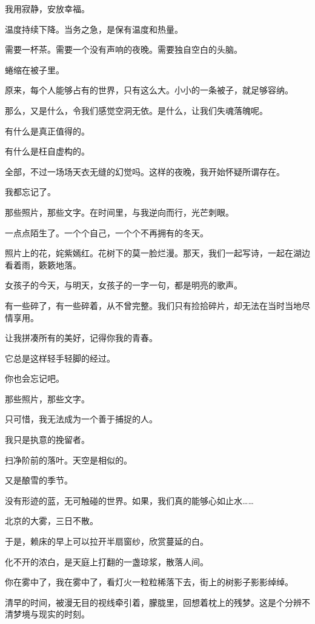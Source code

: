 \documentclass[12pt,a4paper]{article}
\begin{document}
		我用寂静，安放幸福。

		温度持续下降。当务之急，是保有温度和热量。\par
		需要一杯茶。需要一个没有声响的夜晚。需要独自空白的头脑。

		蜷缩在被子里。

		原来，每个人能够占有的世界，只有这么大。小小的一条被子，就足够容纳。\par
		那么，又是什么，令我们感觉空洞无依。是什么，让我们失魂落魄呢。

		有什么是真正值得的。\par
		有什么是枉自虚构的。

		全部，不过一场场天衣无缝的幻觉吗。这样的夜晚，我开始怀疑所谓存在。

		我都忘记了。

		那些照片，那些文字。在时间里，与我逆向而行，光芒刺眼。\par
		一点点陌生了。一个个自己，一个个不再拥有的冬天。

		照片上的花，姹紫嫣红。花树下的莫一脸烂漫。那天，我们一起写诗，一起在湖边看着雨，簌簌地落。\par
		女孩子的今天，与明天，女孩子的一字一句，都是明亮的歌声。\par
		有一些碎了，有一些碎着，从不曾完整。我们只有捡拾碎片，却无法在当时当地尽情享用。

		让我拼凑所有的美好，记得你我的青春。\par
		它总是这样轻手轻脚的经过。

		你也会忘记吧。\par
		那些照片，那些文字。\par
		只可惜，我无法成为一个善于捕捉的人。\par
		我只是执意的挽留者。

		扫净阶前的落叶。天空是相似的。\par
		又是酿雪的季节。

	\endwriting



		没有形迹的蓝，无可触碰的世界。如果，我们真的能够心如止水……

		北京的大雾，三日不散。\par
		于是，赖床的早上可以拉开半扇窗纱，欣赏蔓延的白。\par
		化不开的浓白，是天庭上打翻的一盏琼浆，散落人间。\par
		你在雾中了，我在雾中了，看灯火一粒粒稀落下去，街上的树影子影影绰绰。\par
		清早的时间，被漫无目的视线牵引着，朦胧里，回想着枕上的残梦。这是个分辨不清梦境与现实的时刻。
\end{document}
